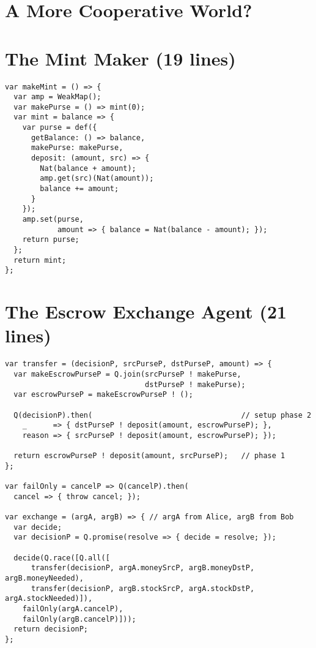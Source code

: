 \documentclass{llncs}
\begin{document}
\section{A More Cooperative World?}

\begin{thebibliography}{5}


\end{thebibliography}

\appendix

\section{The Mint Maker (19 lines)}

\begin{verbatim}
var makeMint = () => {
  var amp = WeakMap();
  var makePurse = () => mint(0);
  var mint = balance => {
    var purse = def({
      getBalance: () => balance,
      makePurse: makePurse,
      deposit: (amount, src) => {
        Nat(balance + amount);
        amp.get(src)(Nat(amount)); 
        balance += amount; 
      } 
    });
    amp.set(purse, 
            amount => { balance = Nat(balance - amount); });
    return purse;
  };
  return mint;
};
\end{verbatim}

\section{The Escrow Exchange Agent (21 lines)}

\begin{verbatim}
var transfer = (decisionP, srcPurseP, dstPurseP, amount) => {
  var makeEscrowPurseP = Q.join(srcPurseP ! makePurse, 
                                dstPurseP ! makePurse);
  var escrowPurseP = makeEscrowPurseP ! ();

  Q(decisionP).then(                                  // setup phase 2
    _      => { dstPurseP ! deposit(amount, escrowPurseP); },
    reason => { srcPurseP ! deposit(amount, escrowPurseP); });

  return escrowPurseP ! deposit(amount, srcPurseP);   // phase 1
};

var failOnly = cancelP => Q(cancelP).then(
  cancel => { throw cancel; });

var exchange = (argA, argB) => { // argA from Alice, argB from Bob
  var decide;
  var decisionP = Q.promise(resolve => { decide = resolve; });

  decide(Q.race([Q.all([
      transfer(decisionP, argA.moneySrcP, argB.moneyDstP, argB.moneyNeeded),
      transfer(decisionP, argB.stockSrcP, argA.stockDstP, argA.stockNeeded)]),
    failOnly(argA.cancelP), 
    failOnly(argB.cancelP)]));
  return decisionP;
};
\end{verbatim}
\end{document}
